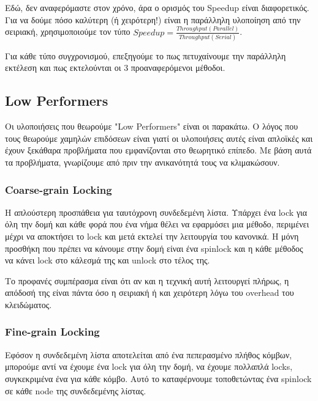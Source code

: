 \documentclass[../final_report.tex]{subfiles}
\begin{document}
Εδώ, δεν αναφερόμαστε στον χρόνο, άρα ο ορισμός του Speedup είναι διαφορετικός. Για να δούμε πόσο καλύτερη (ή χειρότερη!) είναι η παράλληλη υλοποίηση από
την σειριακή, χρησιμοποιούμε τον τύπο \(Speedup=\frac{Throughput(Parallel)}{Throughput(Serial)}\). 

Για κάθε τύπο συγχρονισμού, επεξηγούμε το πως πετυχαίνουμε την παράλληλη εκτέλεση και πως εκτελούνται οι 3 προαναφερόμενοι μέθοδοι.

\subsection{Low Performers}
Οι υλοποιήσεις που θεωρούμε "Low Performers" είναι οι παρακάτω. Ο λόγος που τους θεωρούμε χαμηλών επιδόσεων είναι γιατί οι υλοποιήσεις
αυτές είναι απλοϊκές και έχουν ξεκάθαρα προβλήματα που εμφανίζονται στο θεωρητικό επίπεδο. Με βάση αυτά τα προβλήματα,
γνωρίζουμε από πριν την ανικανότητά τους να κλιμακώσουν.

\subsubsection{Coarse-grain Locking}
Η απλούστερη προσπάθεια για ταυτόχρονη συνδεδεμένη λίστα. Υπάρχει ένα lock για όλη την δομή και κάθε φορά που ένα
νήμα θέλει να εφαρμόσει μια μέθοδο, περιμένει μέχρι να αποκτήσει το lock και μετά εκτελεί την λειτουργία του κανονικά.
Η μόνη προσθήκη που πρέπει να κάνουμε στην δομή είναι ένα spinlock και η κάθε μέθοδος να κάνει lock στο κάλεσμά της και 
unlock στο τέλος της.

Το προφανές συμπέρασμα είναι ότι αν και η τεχνική αυτή λειτουργεί πλήρως, η απόδοσή της είναι πάντα όσο η σειριακή ή και
χειρότερη λόγω του overhead του κλειδώματος. 

\subsubsection{Fine-grain Locking}
Εφόσον η συνδεδεμένη λίστα αποτελείται από ένα πεπερασμένο πλήθος κόμβων, μπορούμε αντί να έχουμε ένα lock για όλη την δομή,
να έχουμε πολλαπλά locks, συγκεκριμένα ένα για κάθε κόμβο. Αυτό το καταφέρνουμε τοποθετώντας ένα spinlock σε κάθε node της συνδεδεμένης λίστας.
\end{document}

